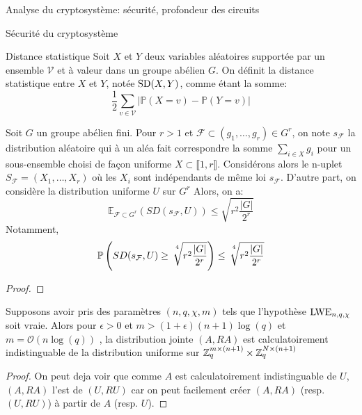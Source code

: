 \begin{section}{Analyse du cryptosystème: sécurité, profondeur des circuits}
	\begin{subsection}{Sécurité du cryptosystème}
	\begin{definition}{Distance statistique}
	Soit $X$ et $Y$ deux variables aléatoires supportée par
	un ensemble $\mathcal{V}$ et à valeur 
	dans un groupe abélien $G$. On définit la distance 
	statistique entre $X$ et $Y$, notée $\text{SD}(X,Y)$, 
	comme étant la somme:
	\[ \frac{1}{2} \sum_{v \in \mathcal{V}} |\mathbb{P}(X = v) -
	\mathbb{P}(Y = v)| \]


	\end{definition}
	\begin{lemme}
	Soit $G$ un groupe abélien fini. Pour $r > 1$ et 
	$\mathcal{F} \subset (g_1, \ldots, g_r) \in G^r$, on
	note
	 $s_\mathcal{F}$ la distribution aléatoire qui à un aléa
	 fait correspondre la somme $\sum_{i\in X} g_i$ pour un
	 sous-ensemble choisi de façon uniforme  $X\subset \llbracket
	 1, r \rrbracket$. 
	 Considérons alors le n-uplet $S_\mathcal{F} = (X_1, \ldots, X_r)$ où 
	 les $X_i$ sont indépendants de même loi
	 $s_\mathcal{F}$.
	 D'autre part, on considère la distribution uniforme
	 $U$ sur $G^r$
	 Alors, on a: 
	 \[\mathbb{E}_{\mathcal{F}\subset G^r}(SD(s_\mathcal{F},U)) \leq 
	   \sqrt{r^2\frac{|G|}{2^r}}\]
	 Notamment, 
	 \[\mathbb{P}\left(SD(s_\mathcal{F},U) \geq
		 \sqrt[\leftroot{-3}\uproot{8}4\:]{r^2\frac{|G|}{2^r}} \right) \leq
		 \sqrt[\leftroot{-3}\uproot{8}4\:]{r^2\frac{|G|}{2^r}}
	 \]
	\end{lemme}
	\begin{proof}
	\end{proof}
	\begin{prop}
	Supposons avoir pris des paramètres $(n, q, \chi, m)$
	tels que l'hypothèse $\text{LWE}_{n,q,\chi}$ soit vraie. Alors pour $\epsilon>0$
	et $m > (1+\epsilon)(n+1)\log(q)$ et $m = \mathcal{O}(n\log(q))$ , la distribution jointe 
	$(A, RA)$ est calculatoirement indistinguable de la
	distribution uniforme sur $\mathbb{Z}_q^{m \times (n+1)} \times \mathbb{Z}_q^{N
	\times (n+1)}$
	\end{prop}
	\begin{proof}
	On peut deja voir que comme $A$ est calculatoirement
	indistinguable de $U$, $(A, RA)$ l'est de $(U,RU)$ car on 
	peut facilement créer $(A, RA)$ (resp. $(U, RU)$) à partir de
	$A$ (resp. $U$).


\end{proof}
\end{subsection}
\end{section}
